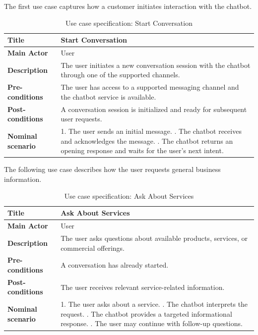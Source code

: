 \noindent The first use case captures how a customer initiates interaction with the chatbot.
\begin{table}[H]
\centering
\caption{Use case specification: Start Conversation}
\label{tab:uc-start-conversation}
\begin{tabular}{|p{}|p{}|}
\hline
\textbf{Title} & Start Conversation \\
\hline
\textbf{Main Actor} & User \\
\hline
\textbf{Description} & The user initiates a new conversation session with the chatbot through one of the supported channels. \\
\hline
\textbf{Pre-conditions} & The user has access to a supported messaging channel and the chatbot service is available. \\
\hline
\textbf{Post-conditions} & A conversation session is initialized and ready for subsequent user requests. \\
\hline
\textbf{Nominal scenario} & 1. The user sends an initial message. \newline 2. The chatbot receives and acknowledges the message. \newline 3. The chatbot returns an opening response and waits for the user's next intent. \\
\hline
\end{tabular}
\end{table}

\noindent The following use case describes how the user requests general business information.
\begin{table}[H]
\centering
\caption{Use case specification: Ask About Services}
\label{tab:uc-ask-about-services}
\begin{tabular}{|p{}|p{}|}
\hline
\textbf{Title} & Ask About Services \\
\hline
\textbf{Main Actor} & User \\
\hline
\textbf{Description} & The user asks questions about available products, services, or commercial offerings. \\
\hline
\textbf{Pre-conditions} & A conversation has already started. \\
\hline
\textbf{Post-conditions} & The user receives relevant service-related information. \\
\hline
\textbf{Nominal scenario} & 1. The user asks about a service. \newline 2. The chatbot interprets the request. \newline 3. The chatbot provides a targeted informational response. \newline 4. The user may continue with follow-up questions. \\
\hline
\end{tabular}
\end{table}


